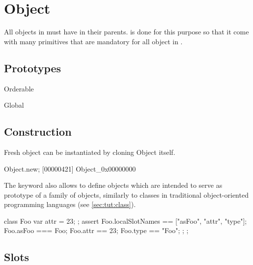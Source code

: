 \section{Object}

All objects in \us must have  in their
parents.  is done for this purpose so that it come
with many primitives that are mandatory for all object in \us.

\subsection{Prototypes}

\begin{refObjects}
\item[Orderable]
\item[Global]
\end{refObjects}

\subsection{Construction}

Fresh object can be instantiated by cloning Object itself.

\begin{urbiscript}[firstnumber=1]
Object.new;
[00000421] Object_0x00000000
\end{urbiscript}

The keyword  also allows to define objects which are
intended to serve as prototype of a family of objects, similarly to
classes in traditional object-oriented programming languages (see
\autoref{sec:tut:class}).

\begin{urbiscript}
{
  class Foo
  {
    var attr = 23;
  };
  assert
  {
    Foo.localSlotNames == ["asFoo", "attr", "type"];
    Foo.asFoo === Foo;
    Foo.attr == 23;
    Foo.type == "Foo";
  };
};
\end{urbiscript}


\subsection{Slots}

